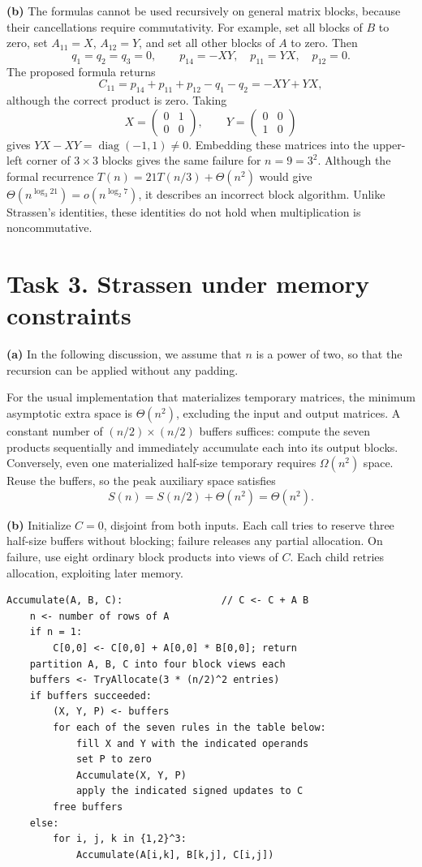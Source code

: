 \documentclass[11pt]{article}
\begin{document}
\textbf{(b)} The formulas cannot be used recursively on general matrix
blocks, because their cancellations require commutativity.
For example, set all blocks of $B$ to zero, set
$A_{11}=X$, $A_{12}=Y$, and set all other blocks of $A$ to zero.
Then
\[
 q_1=q_2=q_3=0,\qquad p_{14}=-XY,\quad p_{11}=YX,\quad p_{12}=0.
\]
The proposed formula returns
\[
 C_{11}=p_{14}+p_{11}+p_{12}-q_1-q_2=-XY+YX,
\]
although the correct product is zero. Taking
\[
 X=\begin{pmatrix}0&1\\0&0\end{pmatrix},\qquad
 Y=\begin{pmatrix}0&0\\1&0\end{pmatrix}
\]
gives $YX-XY=\operatorname{diag}(-1,1)\ne0$.
Embedding these matrices into the upper-left corner of $3\times3$ blocks
gives the same failure for $n=9=3^2$.
Although the formal recurrence $T(n)=21T(n/3)+\Theta(n^2)$ would give
$\Theta(n^{\log_3 21})=o(n^{\log_2 7})$, it describes an incorrect block
algorithm. Unlike Strassen's identities, these identities do not hold 
when multiplication is noncommutative.

\section*{Task 3. Strassen under memory constraints}

\textbf{(a)} 
In the following discussion, we assume that $n$ is a power of two, so that 
the recursion can be applied without any padding. 

For the usual implementation that materializes temporary
matrices, the minimum asymptotic extra space is $\boxed{\Theta(n^2)}$,
excluding the input and output matrices. A constant number of
$(n/2)\times(n/2)$ buffers suffices: compute the seven products sequentially
and immediately accumulate each into its output blocks. 
Conversely, even one materialized half-size temporary requires
$\Omega(n^2)$ space.
Reuse the buffers,
so the peak auxiliary space satisfies
\[
 S(n)=S(n/2)+\Theta(n^2)=\Theta(n^2).
\]

\newpage
\textbf{(b)} Initialize $C=0$, disjoint from both inputs. Each call tries to
reserve three half-size buffers without blocking; failure releases any
partial allocation. On failure, use eight ordinary block products into
views of $C$. Each child retries allocation, exploiting later memory.

\begin{verbatim}
Accumulate(A, B, C):                 // C <- C + A B
    n <- number of rows of A
    if n = 1:
        C[0,0] <- C[0,0] + A[0,0] * B[0,0]; return
    partition A, B, C into four block views each
    buffers <- TryAllocate(3 * (n/2)^2 entries)
    if buffers succeeded:
        (X, Y, P) <- buffers
        for each of the seven rules in the table below:
            fill X and Y with the indicated operands
            set P to zero
            Accumulate(X, Y, P)
            apply the indicated signed updates to C
        free buffers
    else:
        for i, j, k in {1,2}^3:
            Accumulate(A[i,k], B[k,j], C[i,j])
\end{verbatim}
\end{document}
